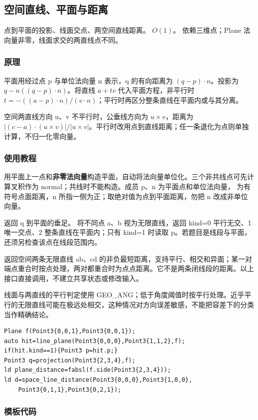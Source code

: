 \subsection{空间直线、平面与距离}
\label{geo:space}
\AlgorithmInfo
    {点到平面的投影、线面交点、两空间直线距离。}
    {$O(1)$。}
    {依赖三维点；Plane 法向量非零，线面求交的两直线点不同。}
\subsubsection*{原理}

平面用经过点 p 与单位法向量 n 表示，q 的有向距离为 $(q-p)\cdot n$。投影为 $q-n((q-p)\cdot n)$。将直线 $a+tv$ 代入平面方程，非平行时 $t=-((a-p)\cdot n)/(v\cdot n)$；平行时再区分整条直线在平面内或与其分离。

空间两直线方向 u、v 不平行时，公垂线方向为 $u\times v$，距离为 $|(c-a)\cdot(u\times v)|/|u\times v|$。平行时改用点到直线距离；任一条退化为点则单独计算，不归一化零向量。

\subsubsection*{使用教程}
 用平面上一点和\textbf{非零法向量}构造平面，自动将法向量单位化。三个非共线点可先计算叉积作为 normal；共线时不能构造。成员 p、n 为平面点和单位法向量， 为有符号点面距离，n 所指一侧为正；取绝对值为点到平面距离，勿把 n 改成非单位向量。

 返回 q 到平面的垂足。 将不同点 a、b 视为无限直线，返回 kind=0 平行无交、1 唯一交点、2 整条直线在平面内；只有 kind=1 时读取 p。若题目是线段与平面，还须另检查该点在线段范围内。

 返回空间两条无限直线 ab、cd 的非负最短距离，支持平行、相交和异面；某一对端点重合时按点处理，两对都重合时为点点距离。它不是两条闭线段的距离。以上接口直接调用，不建立共享状态或修改输入。

线面与两直线的平行判定使用 GEO\_ANG；低于角度阈值时按平行处理。近乎平行的无限直线可能在极远处相交，这种情况对方向误差敏感，不能把容差下的分类当作精确结论。
\begin{lstlisting}[style=mtycpp,numbers=none]
Plane f(Point3{0,0,1},Point3{0,0,1});
auto hit=line_plane(Point3{0,0,0},Point3{1,1,2},f);
if(hit.kind==1){Point3 p=hit.p;}
Point3 q=projection(Point3{2,3,4},f);
ld plane_distance=fabsl(f.side(Point3{2,3,4}));
ld d=space_line_distance(Point3{0,0,0},Point3{1,0,0},
	Point3{0,1,1},Point3{0,2,1});
\end{lstlisting}
\subsubsection*{模板代码}
